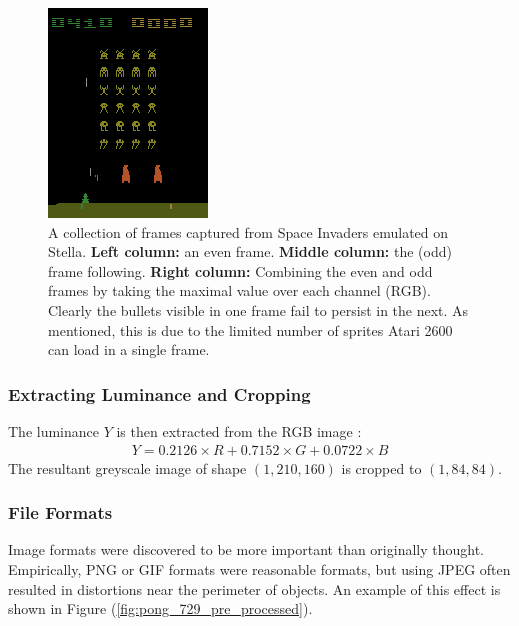 \begin{figure}
\begin{multicols}{3}
    \includegraphics[scale=0.8]{figures/related_work/space_invaders_1044_rgb_maximum_of_even_odd.png}\par
\end{multicols}
\caption{A collection of frames captured from Space Invaders emulated on Stella. \textbf{Left column:} an even frame. \textbf{Middle column:} the (odd) frame following. \textbf{Right column:} Combining the even and odd frames by taking the maximal value over each channel (RGB). Clearly the bullets visible in one frame fail to persist in the next. As mentioned, this is due to the limited number of sprites Atari 2600 can load in a single frame.}
\label{fig:even_and_odd_frames_space_invaders}
\end{figure}

\subsubsection{Extracting Luminance and Cropping}
The luminance $Y$ is then extracted from the RGB image \cite{Stokes1996}:
\begin{align}
Y = 0.2126\times R + 0.7152\times G + 0.0722\times B
\end{align}
The resultant greyscale image of shape $(1, 210, 160)$ is cropped to $(1, 84, 84)$.

\subsubsection{File Formats}
Image formats were discovered to be more important than originally thought. Empirically, PNG or GIF formats were reasonable formats, but using JPEG often resulted in distortions near the perimeter of objects. An example of this effect is shown in Figure (\ref{fig:pong_729_pre_processed}).\\

